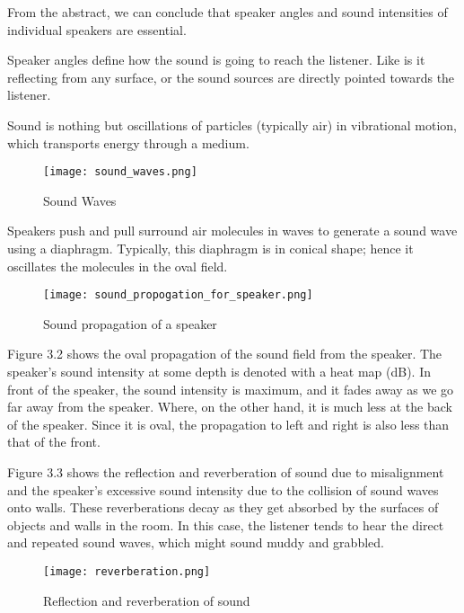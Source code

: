 \documentclass[../../../patent_v1.tex]{subfiles}
\begin{document}
From the abstract, we can conclude that speaker angles and sound intensities of 
individual speakers are essential.

Speaker angles define how the sound is going to reach the listener. Like is it 
reflecting from any surface, or the sound sources are directly pointed towards the 
listener.

Sound is nothing but oscillations of particles (typically air) in vibrational motion, 
which transports energy through a medium.

\begin{figure}
    \texttt{[image: sound\_waves.png]}
    \caption{Sound Waves}
\end{figure}

\FloatBarrier

Speakers push and pull surround air molecules in waves to generate a sound wave using a 
diaphragm. Typically, this diaphragm is in conical shape; hence it oscillates the 
molecules in the oval field. 

\begin{figure*}[ht]
    \texttt{[image: sound\_propogation\_for\_speaker.png]}
    \caption{Sound propagation of a speaker}
\end{figure*}

\FloatBarrier

Figure 3.2 shows the oval propagation of the sound field from the speaker. The speaker's 
sound intensity at some depth is denoted with a heat map (dB). In front of the speaker, 
the sound intensity is maximum, and it fades away as we go far away from the speaker. 
Where, on the other hand, it is much less at the back of the speaker. Since it is oval, 
the propagation to left and right is also less than that of the front.

Figure 3.3 shows the reflection and reverberation of sound due to misalignment and the 
speaker's excessive sound intensity due to the collision of sound waves onto walls. 
These reverberations decay as they get absorbed by the surfaces of objects and walls in 
the room. In this case, the listener tends to hear the direct and repeated sound waves, 
which might sound muddy and grabbled.

\begin{figure}
    \texttt{[image: reverberation.png]}
    \caption{Reflection and reverberation of sound}
\end{figure}

\FloatBarrier
\end{document}

